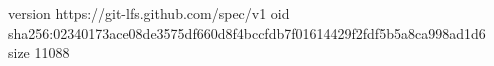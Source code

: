 version https://git-lfs.github.com/spec/v1
oid sha256:02340173ace08de3575df660d8f4bccfdb7f01614429f2fdf5b5a8ca998ad1d6
size 11088
